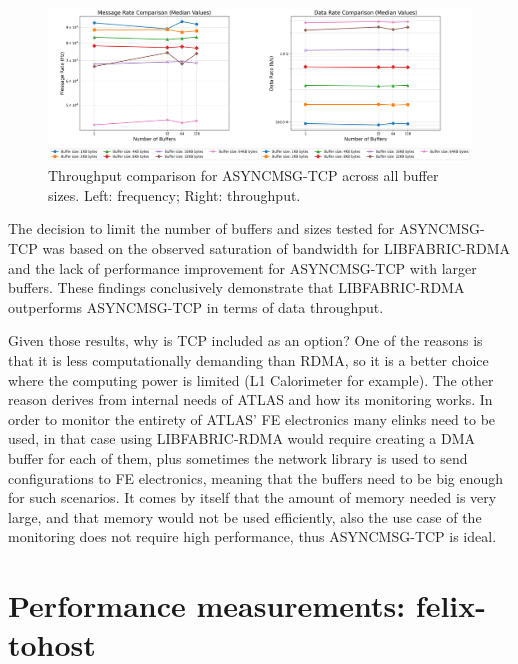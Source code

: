 \begin{figure}[htbp]
\centering
\includegraphics[width=\textwidth]{images/results/tcp_performance_comparison.png}
\caption{Throughput comparison for ASYNCMSG-TCP across all buffer sizes. Left: frequency; Right: throughput.}
\label{fig:tcp-mean-throughput-comparison}
\end{figure}

The decision to limit the number of buffers and sizes tested for ASYNCMSG-TCP was based on the observed saturation of bandwidth for LIBFABRIC-RDMA and the lack of performance improvement for ASYNCMSG-TCP with larger buffers. These findings conclusively demonstrate that LIBFABRIC-RDMA outperforms ASYNCMSG-TCP in terms of data throughput.

Given those results, why is TCP included as an option? One of the reasons is that it is less computationally demanding than \acs{RDMA}, so it is a better choice where the computing power is limited (L1 Calorimeter for example). The other reason derives from internal needs of \acs{ATLAS} and how its monitoring works. In order to monitor the entirety of \acs{ATLAS}' \acl{FE} electronics many elinks need to be used, in that case using LIBFABRIC-RDMA would require creating a \acs{DMA} buffer for each of them, plus sometimes the network library is used to send configurations to \acs{FE} electronics, meaning that the buffers need to be big enough for such scenarios. It comes by itself that the amount of memory needed is very large, and that memory would not be used efficiently, also the use case of the monitoring does not require high performance, thus ASYNCMSG-TCP is ideal.

\clearpage
\section{Performance measurements: felix-tohost}

